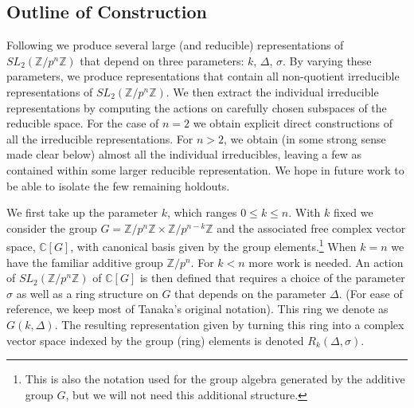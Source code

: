\documentclass[12pt,reqno]{amsart}
\theoremstyle{remark}
\numberwithin{table}{section}
\newcommand{\C}{\mathbb C}
\newcommand{\Z}{\mathbb Z}
\begin{document}

\subsection{Outline of Construction}

Following  \cite{Tanaka67-1} we produce several large (and reducible) representations of $SL_2(\Z/p^n \Z)$ that depend on three parameters: $k$, $\Delta$, $\sigma$. By varying these parameters,  we produce representations that contain all non-quotient irreducible representations of $SL_2(\Z/p^n \Z)$.  We then extract the individual irreducible representations by computing the actions on carefully chosen subspaces of the reducible space. For the case of $n=2$ we obtain explicit direct constructions of all the irreducible representations. For $n>2$, we obtain (in some strong sense made clear below) almost all the individual irreducibles, leaving a few as contained within some larger reducible representation. We hope in future work to be able to isolate the few remaining holdouts. 

We first take up the parameter $k$, which ranges $0\leq k \leq n$. With $k$ fixed we consider the group $G = \Z/p^n \Z \times \Z/p^{n -k}  \Z$  and the associated free complex vector space,  $\C [G]$, with canonical basis given by the group elements.\footnote{This is also the notation used for the group algebra generated by  the additive group $G$, but we will not need this additional structure.}   When $k=n$ we have the familiar additive group $\Z/p^n$. For $k<n$ more work is needed. An action of $SL_2(\Z/p^n \Z)$ of $\C[G]$ is then defined that requires a choice of the parameter $\sigma$ as well as a  ring structure on $G$ that depends on the parameter $\Delta$. (For ease of reference, we keep most of Tanaka's original notation). This ring we denote as $G(k,\Delta)$. The resulting representation given by turning this ring into a complex vector space indexed by the group (ring) elements is denoted $R_k(\Delta, \sigma)$.
\end{document}
